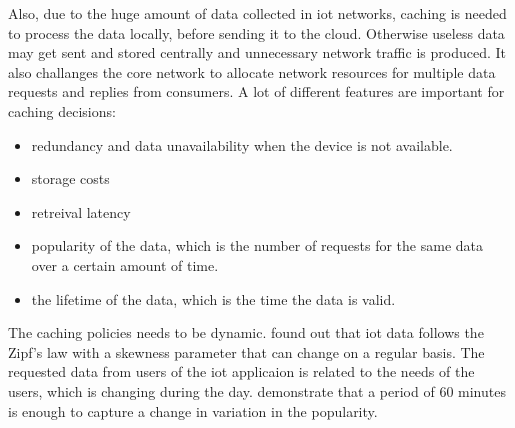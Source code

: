 \documentclass[conference]{IEEEtran}
\begin{document}
	Also, due to the huge amount of data collected in \ac{iot} networks, caching is needed to process the data locally, before sending it to the cloud. Otherwise useless data may get sent and stored centrally and unnecessary network traffic is produced. \cite{caching-1} It also challanges the core network to allocate network resources for multiple data requests and replies from consumers. \cite{caching-2}
	A lot of different features are important for caching decisions:

	\begin{itemize}
		\item redundancy and data unavailability when the device is not available. \cite{caching-1}
		\item storage costs
		\item retreival latency
		\item popularity of the data, which is the number of requests for the same data over a certain amount of time. \cite{caching-2}
		\item the lifetime of the data, which is the time the data is valid. \cite{caching-2}
	\end{itemize}

	The caching policies needs to be dynamic. \cite{caching-5} found out that \ac{iot} data follows the Zipf's law with a skewness parameter that can change on a regular basis. The requested data from users of the \ac{iot} applicaion is related to the needs of the users, which is changing during the day. \citeauthor{caching-5} demonstrate that a period of 60 minutes is enough to capture a change in variation in the popularity.  
\end{document}
